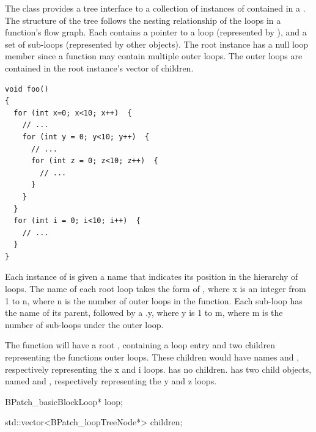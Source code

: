 
The  class provides a tree interface to a
collection of instances of 
contained in a . The structure of the tree
follows the nesting relationship of the loops in a
function's flow graph. Each  contains a
pointer to a loop (represented by
), and a set of sub-loops (represented
by other  objects). The root
 instance has a null loop member since a
function may contain multiple outer loops. The outer
loops are contained in the root instance's vector of children.

\begin{lstlisting}
void foo()
{
  for (int x=0; x<10; x++)  {
    // ...
    for (int y = 0; y<10; y++)  {
      // ...
      for (int z = 0; z<10; z++)  {
        // ...
      }
    }
  }
  for (int i = 0; i<10; i++)  {
    // ...
  }
}
\end{lstlisting}

Each instance of  is given a name that
indicates its position in the hierarchy of loops. The name
of each root loop takes the form of , where x is an
integer from 1 to n, where n is the number of outer loops in
the function. Each sub-loop has the name of its parent, followed by a
.y, where y is 1 to m, where m is the number of
sub-loops under the outer loop.

The  function will have a root ,
containing a  loop entry and two 
children representing the functions outer loops. These children would
have names  and , respectively
representing the x and i loops.  has no children.
 has two child  objects, named
 and , respectively representing the
y and z loops.

\begin{apient}
  BPatch_basicBlockLoop* loop;
\end{apient}


\begin{apient}
  std::vector<BPatch_loopTreeNode*> children;
\end{apient}

